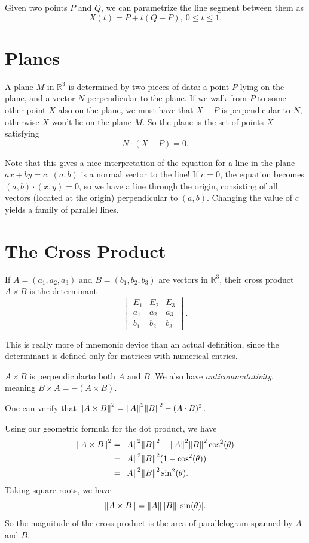 \documentclass{article}
\begin{document}
Given two points $P$ and $Q$, we can parametrize the line segment 
between them as 
\[X(t) = P + t(Q-P),\ 0 \leq t \leq 1.\]

\section*{Planes}

A plane $M$ in $\mathbb{R}^3$ is determined by two pieces of data: 
a point $P$ lying on the plane, and a vector $N$ perpendicular
to the plane. If we walk from $P$ to some other point $X$ also on the plane,
we must have that $X-P$ is perpendicular to $N$, otherwise $X$ won't lie
on the plane $M$. So the plane is the set of points $X$ satisfying
\[N \cdot (X-P) = 0.\]

Note that this gives a nice interpretation of the equation for a line
in the plane $ax+by=c$. $(a,b)$ is a normal vector to the line!
If $c=0$, the equation becomes $(a,b)\cdot (x,y) = 0$, so we have
a line through the origin, consisting of all vectors (located at the origin)
perpendicular to $(a,b)$. Changing the value of $c$ yields a family
of parallel lines.

\section*{The Cross Product}

If $A=(a_1,a_2,a_3)$ and $B=(b_1,b_2,b_3)$ are vectors in $\mathbb{R}^3$,
their cross product $A \times B$ is the determinant
\[ \begin{vmatrix}
    E_1 & E_2 & E_3\\
    a_1 & a_2 & a_3\\
    b_1 & b_2 & b_3
    \end{vmatrix} .\]

This is really more of mnemonic device than an actual definition, since
the determinant is defined only for matrices with numerical entries. 

$A \times B$ is perpendicularto both $A$ and $B$. We also have 
\emph{anticommutativity}, meaning $B \times A = -(A \times B)$.

One can verify that $\norm{A \times B}^2 = \norm{A}^2 \norm{B}^2 - (A \cdot B)^2$.

Using our geometric formula for the dot product, we have
\begin{align*}
    \norm{A \times B}^2 &= \norm{A}^2 \norm{B}^2 - \norm{A}^2 \norm{B}^2 \cos^2(\theta)\\
    &= \norm{A}^2 \norm{B}^2 (1 - \cos^2(\theta))\\
    &= \norm{A}^2 \norm{B}^2 \sin^2(\theta).
\end{align*}
Taking square roots, we have
\[\norm{A\times B} = \norm{A} \norm{B} |\sin(\theta)|. \]
So the magnitude of the cross product is the area of parallelogram
spanned by $A$ and $B$.

\end{document}
